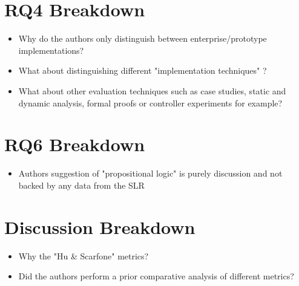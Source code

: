 \section{RQ4 Breakdown}

\begin{itemize}

\item Why do the authors only distinguish between enterprise/prototype implementations?

\item What about distinguishing different "implementation techniques" ?

\item What about other evaluation techniques such as case studies, static and dynamic analysis, formal proofs or controller experiments for example?

\end{itemize}


\section{RQ6 Breakdown}

\begin{itemize}

\item Authors suggestion of "propositional logic" is purely discussion and not backed by any data from the SLR

\end{itemize}


\section{Discussion Breakdown}

\begin{itemize}

\item Why the "Hu \& Scarfone" metrics?

\item Did the authors perform a prior comparative analysis of different metrics?

\end{itemize}
